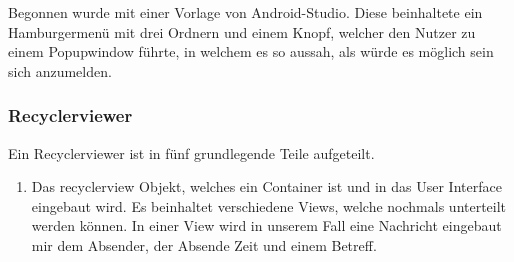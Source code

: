 \documentclass[a4paper,11pt]{article}
\begin{document}
Begonnen wurde mit einer Vorlage von Android-Studio. Diese beinhaltete ein Hamburgermenü mit drei Ordnern und einem Knopf, 
welcher den Nutzer zu einem Popupwindow führte, in welchem es so aussah, als würde es möglich sein sich anzumelden.  

\subsubsection{Recyclerviewer}

Ein Recyclerviewer ist in fünf grundlegende Teile aufgeteilt. 

\begin{enumerate}

    \item Das recyclerview Objekt, welches ein Container ist und in das User Interface eingebaut wird. 
Es beinhaltet verschiedene Views, welche nochmals unterteilt werden können. In einer View wird in unserem 
Fall eine Nachricht eingebaut mir dem Absender, der Absende Zeit und einem Betreff. 

\end{enumerate}

\endgroup
\end{document}
